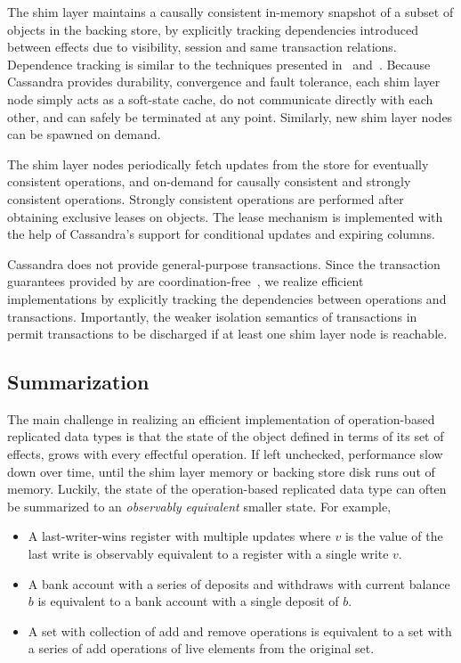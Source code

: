 The shim layer maintains a causally consistent in-memory snapshot of a subset
of objects in the backing store, by explicitly tracking dependencies introduced
between effects due to visibility, session and same transaction relations.
Dependence tracking is similar to the techniques presented in~\cite{BoltOn}
and~\cite{Eiger}. Because Cassandra provides durability, convergence and fault
tolerance, each shim layer node simply acts as a soft-state cache, do not
communicate directly with each other, and can safely be terminated at any point.
Similarly, new shim layer nodes can be spawned on demand.

The shim layer nodes periodically fetch updates from the store for eventually
consistent operations, and on-demand for causally consistent and strongly
consistent operations. Strongly consistent operations are performed after
obtaining exclusive leases on objects. The lease mechanism is implemented with
the help of Cassandra's support for conditional updates and expiring columns.

Cassandra does not provide general-purpose transactions. Since the transaction
guarantees provided by \name are coordination-free~\cite{BailisHAT}, we realize
efficient implementations by explicitly tracking the dependencies between
operations and transactions. Importantly, the weaker isolation semantics of
transactions in \name permit transactions to be discharged if at least one shim
layer node is reachable.

\subsection{Summarization}

The main challenge in realizing an efficient implementation of
operation-based replicated data types is that the state of the object
defined in terms of its set of effects, grows with every effectful
operation. If left unchecked, performance slow down over time, until the
shim layer memory or backing store disk runs out of memory. Luckily, the
state of the operation-based replicated data type can often be summarized to
an \emph{observably equivalent} smaller state. For example,

\begin{itemize}
\setlength{\itemsep}{2pt}
\item A last-writer-wins register with multiple updates where $v$ is the value
of the last write is observably equivalent to a register with a single write
$v$.

\item A bank account with a series of deposits and withdraws with current
balance $b$ is equivalent to a bank account with a single deposit of $b$.

\item A set with collection of add and remove operations is equivalent to a set
with a series of add operations of live elements from the original set.
\end{itemize}

